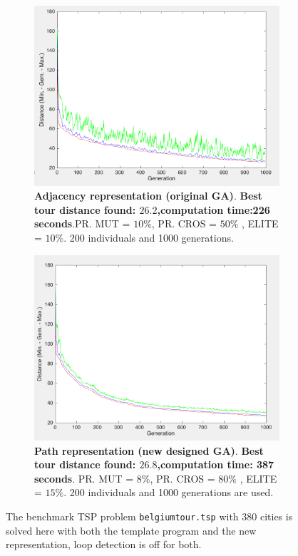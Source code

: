 \begin{figure}[!]
\centering
\begin{subfigure}{0.45\textwidth}
  \centering
    \includegraphics[width=1\textwidth]{../figures/figures_question_4/adj_vraag4_on_gen}
      \caption{\textbf{Adjacency representation (original GA)}. \textbf{Best tour distance found: $\mathbf{26.2}$,computation time:226 seconds}.PR. MUT = $10\%$, PR. CROS = $50\%$ , ELITE = $10\%$. 200 individuals and 1000 generations.}
      \label{fig:adj_vraag4_on_gen}
\end{subfigure}%
\hspace{0.05\textwidth}
\begin{subfigure}{0.45\textwidth}
  \centering
    \includegraphics[width=1\textwidth]{../figures/figures_question_4/path_vraag4_on_gen}
      \caption{\textbf{Path representation (new designed GA)}. \textbf{Best tour distance found:  $\mathbf{26.8}$,computation time: 387 seconds}. PR. MUT = $8\%$, PR. CROS = $80\%$ , ELITE = $15\%$. 200 individuals and 1000 generations are used.}
      \label{fig:path_vraag4_on_gen}
\end{subfigure}
\caption{The benchmark TSP problem \texttt{belgiumtour.tsp} with 380 cities is solved here with both the template program and the new representation, loop detection is off for both.}
\label{fig:tour380_on}
\end{figure}
